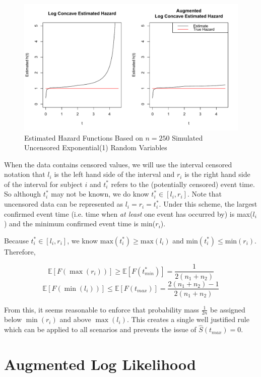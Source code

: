 \documentclass[11pt]{article}
\numberwithin{equation}{section}
\begin{document}
	
	\begin{figure}[H]
	\centerline{\includegraphics[width = 15cm]{EstimateHazards.pdf} }
	\caption{Estimated Hazard Functions Based on $n = 250$ Simulated Uncensored Exponential(1) Random Variables}
	\label{fig:AugHaz}
	\end{figure} 
	
	When the data contains censored values, we will use the interval censored notation that $l_i$ is the left hand side of the interval and $r_i$ is the right hand side of the interval for subject $i$ and $t^*_i$ refers to the (potentially censored) event time. So although $t^*_i$ may not be known, we do know $t^*_i \in [l_i, r_i]$. Note that uncensored data can be represented as $l_i = r_i = t^*_i$. Under this scheme, the largest confirmed event time (i.e. time when \emph{at least} one event has occurred by) is max($l_i$) and the minimum confirmed event time is min($r_i$). 
	
	Because $t^*_i \in [l_i, r_i]$, we know $\text{max}(t^*_i) \geq \text{max}(l_i)$ and $\text{min}(t^*_i) \leq \text{min}(r_i)$. Therefore,
		
	\[
	\mathbb{E}[F(\max(r_i))] \geq \mathbb{E}[F(t^*_{min})] = \frac{1}{2(n_1 + n_2)}
	\]
	\[
	\mathbb{E}[F(\min(l_i) )] \leq \mathbb{E}[F(t_{max} )] = \frac{2(n_1 + n_2)-1}{2(n_1 +n_2)}
	\]
	
	From this, it seems reasonable to enforce that probability mass $\frac{1}{2n}$ be assigned below $\min(r_i)$ and above $\max(l_i)$. This creates a single well justified rule which can be applied to all scenarios  and prevents the issue of $\hat S(t_{max}) = 0$. 
		
{\section{Augmented Log Likelihood} }
			
\end{document}
